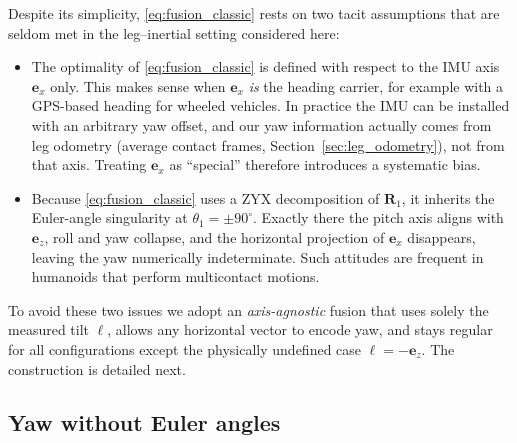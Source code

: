\documentclass{IJCAS}
\begin{document}
Despite its simplicity, \eqref{eq:fusion_classic} rests on two tacit
assumptions that are seldom met in the leg–inertial setting considered
here:

\begin{itemize}
\item The optimality of \eqref{eq:fusion_classic} is defined with
      respect to the IMU axis $\boldsymbol{e}_{x}$ only.  
      This makes sense when $\boldsymbol{e}_{x}$ \emph{is} the heading
      carrier, for example with a GPS-based heading for wheeled vehicles.  
      In practice the IMU can be installed with an arbitrary yaw
      offset, and our yaw information actually comes from leg odometry
      (average contact frames, Section~\ref{sec:leg_odometry}), not from
      that axis.  Treating $\boldsymbol{e}_{x}$ as ``special'' therefore
      introduces a systematic bias.

\item Because \eqref{eq:fusion_classic} uses a ZYX decomposition of
      $\boldsymbol{R}_{1}$, it inherits the Euler-angle singularity at
      $\theta_{1}= \pm 90^{\circ}$.  
      Exactly there the pitch axis aligns with
      $\boldsymbol{e}_{z}$, roll and yaw collapse, and the horizontal
      projection of $\boldsymbol{e}_{x}$ disappears, leaving the yaw
      numerically indeterminate.  
      Such attitudes are frequent in humanoids that perform
      multicontact motions.
\end{itemize}
To avoid these two issues we adopt an \emph{axis-agnostic} fusion that
uses solely the measured tilt $\boldsymbol{\ell}$, allows any horizontal
vector to encode yaw, and stays regular for all configurations except
the physically undefined case $\boldsymbol{\ell}=-\boldsymbol{e}_{z}$.
The construction is detailed next.

\subsection{Yaw without Euler angles}
\label{sec:yaw_no_euler}
\end{document}
